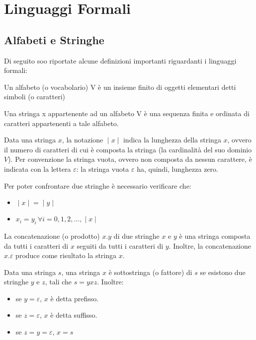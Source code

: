 \chapter{Linguaggi Formali}

  \section{Alfabeti e Stringhe}
  Di seguito soo riportate alcune definizioni importanti riguardanti i linguaggi formali:
  \begin{definition}[Alfabeto]
    Un alfabeto (o vocabolario) V è un insieme finito di oggetti elementari detti simboli (o caratteri)
  \end{definition} 

  \begin{definition} [Stringa]
    Una stringa x appartenente ad un alfabeto V è una sequenza finita e ordinata di caratteri appartenenti a tale alfabeto.
  \end{definition}

  Data una stringa \(x\), la notazione \(\;|\;x\;|\;\) indica la lunghezza della stringa \(x\), ovvero il numero di caratteri di cui è composta la stringa (la cardinalità del suo dominio \(V\)). Per convenzione la stringa vuota, ovvero non composta da nessun carattere, è indicata con la lettera \(\varepsilon\): la stringa vuota \(\varepsilon\) ha, quindi, lunghezza zero. 

  Per poter confrontare due stringhe è necessario verificare che:
  \begin{itemize}
    \item \(\;|\;x\;|\; = \;|\;y\;|\;\)
    \item \(x_i = y_i\, \forall i=0,1,2,...,\;|\;x\;|\;\)
  \end{itemize}

  La concatenazione (o prodotto) \(x.y\) di due stringhe \(x\) e \(y\) è una stringa composta da tutti i caratteri di \(x\) seguiti da tutti i caratteri di \(y\). Inoltre, la concatenazione \(x.\varepsilon\) produce come risultato la stringa \(x\).

  Data una stringa \(s\), una stringa \(x\) è sottostringa (o fattore) di \(s\) se esistono due stringhe \(y\) e \(z\), tali che \(s=yxz\). Inoltre:
  \begin{itemize}
    \item se \(y=\varepsilon\), \(x\) è detta prefisso.
    \item se \(z=\varepsilon\), \(x\) è detta suffisso.
    \item se \(z=y=\varepsilon\), \(x=s\)
  \end{itemize}

